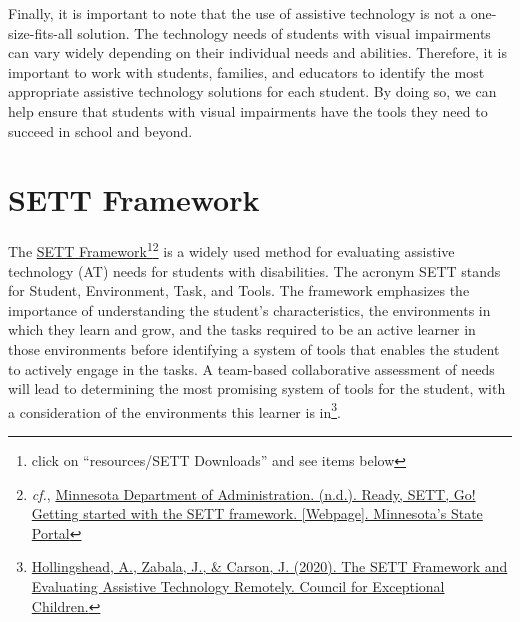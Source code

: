 Finally, it is important to note that the use of assistive technology is not a one-size-fits-all solution. The technology needs of students with visual impairments can vary widely depending on their individual needs and abilities. Therefore, it is important to work with students, families, and educators to identify the most appropriate assistive technology solutions for each student. By doing so, we can help ensure that students with visual impairments have the tools they need to succeed in school and beyond.

\section{SETT Framework}\label{trouble41}
The  \href{https://www.joyzabala.com/links-resources}{SETT Framework}\footnote{\raggedright click on ``resources/SETT Downloads'' and see items below}\footnote{\raggedright \emph{cf.}, \href{https://mn.gov/admin/at/getting-started/ready-sett-go.jsp}{Minnesota Department of Administration. (n.d.). Ready, SETT, Go! Getting started with the SETT framework. [Webpage]. Minnesota’s State Portal}} is a widely used method for evaluating assistive technology (AT) needs for students with disabilities. The acronym SETT stands for Student, Environment, Task, and Tools. The framework emphasizes the importance of understanding the student’s characteristics, the environments in which they learn and grow, and the tasks required to be an active learner in those environments before identifying a system of tools that enables the student to actively engage in the tasks. A team-based collaborative assessment of needs will lead to determining the most promising system of tools for the student, with a consideration of the environments this learner is in\footnote{\raggedright \href{https://exceptionalchildren.org/blog/sett-framework-and-evaluating-assistive-technology-remotely}{Hollingshead, A., Zabala, J., \& Carson, J. (2020). The SETT Framework and Evaluating Assistive Technology Remotely. Council for Exceptional Children.} }.

